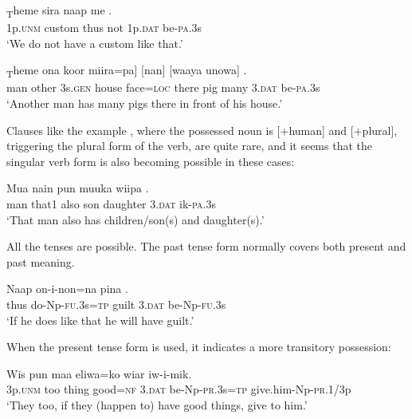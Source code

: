 \ea%
\label{ex:5:x973}
\gll [\textstyleEmphasizedVernacularWords{I}]\textsubscript{T}heme  sira  naap  me   . \\
     1p.\textsc{unm}  custom  thus  not  1p.\textsc{dat}  be-\textsc{pa}.3s \\
\glt `We do not have a custom like that.'
\z

\ea%
\label{ex:5:x972}
\textsubscript{T}heme  ona  koor  miira=pa]  [nan]  [waaya unowa]   . \\
     man  other  3s.\textsc{gen}  house  face=\textsc{loc}  there  pig many  3.\textsc{dat}  be-\textsc{pa}.3s \\
\glt `Another man has many pigs there in front of his house.'
\z

Clauses like the example , where the possessed noun is [+human] and [+plural], triggering the plural form of the verb, are quite rare, and it seems that the singular verb form is also becoming possible in these cases:

\ea%
\label{ex:5:x1321}
\gll Mua  nain  pun  muuka  wiipa   . \\
     man  that1  also  son  daughter  3.\textsc{dat}  ik-\textsc{pa}.3s \\
\glt `That man also has children/son(s) and daughter(s).'
\z

All the tenses are possible. The past tense form normally covers both present and past meaning.

\ea%
\label{ex:5:x1066}
\gll Naap  on-i-non=na  pina   . \\
     thus  do-Np-\textsc{fu}.3s=\textsc{tp}  guilt  3.\textsc{dat}  be-Np-\textsc{fu}.3s \\
\glt `If he does like that he will have guilt.'
\z

When the present tense form is used, it indicates a more transitory possession:

\ea%
\label{ex:5:x1201}
\gll Wis  pun  maa  eliwa=ko  wiar   iw-i-mik. \\
     3p.\textsc{unm}  too  thing  good=\textsc{nf}  3.\textsc{dat}  be-Np-\textsc{pr}.3s=\textsc{tp} give.him-Np-\textsc{pr}.1/3p \\
\glt `They too, if they (happen to) have good things, give to him.'
\z

